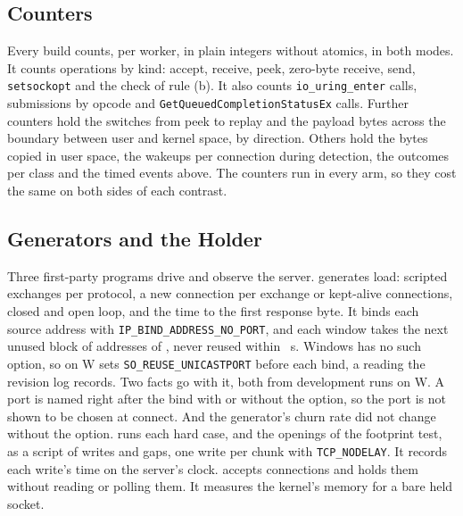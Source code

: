 \subsection{Counters}\label{sec:counters}

Every build counts, per worker, in plain integers without atomics, in both modes. It counts
operations by kind: accept, receive, peek, zero-byte receive, send, \texttt{setsockopt} and the
check of rule (b). It also counts \texttt{io\_uring\_enter} calls, submissions by opcode and
\texttt{GetQueuedCompletionStatusEx} calls. Further counters hold the switches from peek to replay
and the payload bytes across the boundary between user and kernel space, by direction. Others hold
the bytes copied in user space, the wakeups per connection during detection, the outcomes per class
and the timed events above. The counters run in every arm, so they cost the same on
both sides of each contrast.

\subsection{Generators and the Holder}\label{sec:generators}

Three first-party programs drive and observe the server. \opgen{} generates load: scripted
exchanges per protocol, a new connection per exchange or kept-alive connections, closed and open
loop, and the time to the first response byte. It binds each source address with
\texttt{IP\_BIND\_ADDRESS\_NO\_PORT}, and each window takes the next unused block of
\KSrc{} addresses of \LoopbackNet{}, never reused within \TimeWaitS{}~s. Windows has no such
option, so on W \opgen{} sets \texttt{SO\_REUSE\_UNICASTPORT} before each bind, a reading the
revision log records. Two facts go with it, both from development runs on W. A port is named right
after the bind with or without the option, so the port is not shown to be chosen at connect. And
the generator's churn rate did not change without the option. \opcase{} runs each hard
case, and the openings of the footprint test, as a script of writes and gaps, one write per chunk
with \texttt{TCP\_NODELAY}. It records each write's time on the server's clock. \ophold{} accepts
connections and holds them without reading or polling them. It measures the kernel's memory for a
bare held socket.
